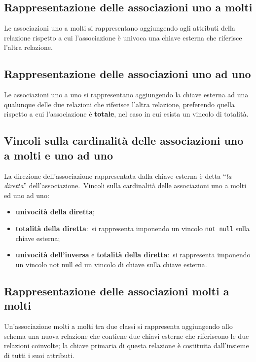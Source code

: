 \subsection{Rappresentazione delle associazioni uno a molti}

Le associazioni uno a molti si rappresentano aggiungendo agli attributi della relazione rispetto a cui l'associazione è univoca una chiave esterna che riferisce l'altra relazione.

\subsection{Rappresentazione delle associazioni uno ad uno}

Le associazioni uno a uno si rappresentano aggiungendo la chiave esterna ad una qualunque delle due relazioni che riferisce l'altra relazione, preferendo quella rispetto a cui l'associazione è \textbf{totale}, nel caso in cui esista un vincolo di totalità.\

\subsection{Vincoli sulla cardinalità delle associazioni uno a molti e uno ad uno}

La direzione dell'associazione rappresentata dalla chiave esterna è detta ``\textit{la diretta}'' dell'associazione.\
Vincoli sulla cardinalità delle associazioni uno a molti ed uno ad uno:
\begin{itemize}
	\item \textbf{univocità della diretta};
	\item \textbf{totalità della diretta}:\ si rappresenta imponendo un vincolo \texttt{not null} sulla chiave esterna;
	\item \textbf{univocità dell'inversa} e \textbf{totalità della diretta}:\ si rappresenta imponendo un vincolo not null ed un vincolo di chiave sulla chiave esterna.
\end{itemize}

\subsection{Rappresentazione delle associazioni molti a molti}

Un'associazione molti a molti tra due classi si rappresenta aggiungendo allo schema una nuova relazione che contiene due chiavi esterne che riferiscono le due relazioni coinvolte; la chiave primaria di questa relazione è costituita dall'insieme di tutti i suoi attributi.

